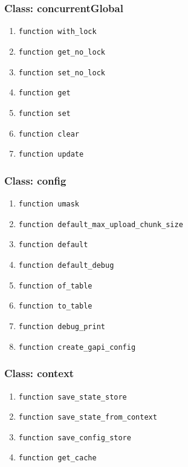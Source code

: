 \subsubsection{Class: concurrentGlobal}
\begin{enumerate}
    \item \verb|function with_lock| 
    \item \verb|function get_no_lock| 
    \item \verb|function set_no_lock| 
    \item \verb|function get| 
    \item \verb|function set| 
    \item \verb|function clear| 
    \item \verb|function update| 
\end{enumerate}
\subsubsection{Class: config}
\begin{enumerate}
    \item \verb|function umask| 
    \item \verb|function default_max_upload_chunk_size|
    \item \verb|function default|
    \item \verb|function default_debug|
    \item \verb|function of_table|
    \item \verb|function to_table|
    \item \verb|function debug_print|
    \item \verb|function create_gapi_config|
\end{enumerate}
\subsubsection{Class: context}
\begin{enumerate}
    \item \verb|function save_state_store| 
    \item \verb|function save_state_from_context| 
    \item \verb|function save_config_store| 
    \item \verb|function get_cache| 
\end{enumerate}
